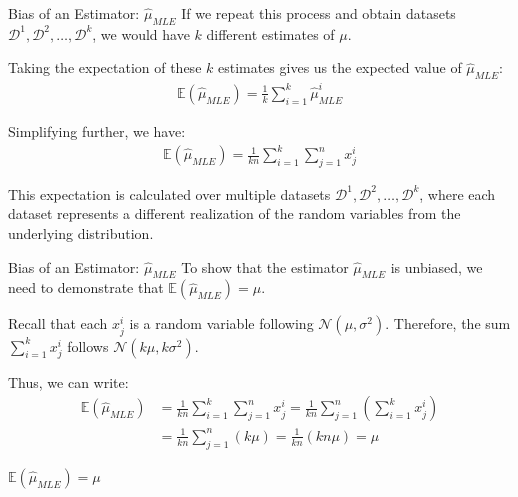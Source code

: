 \documentclass[handout]{beamer}
\begin{document}
    \begin{frame}{Bias of an Estimator: $\hat{\mu}_{MLE}$}
        If we repeat this process and obtain datasets $\mathcal{D}^1, \mathcal{D}^2, \ldots, \mathcal{D}^k$, we would have $k$ different estimates of $\mu$.
    
        Taking the expectation of these $k$ estimates gives us the expected value of $\hat{\mu}_{MLE}$:
        \begin{align*}
            \mathbb{E}(\hat{\mu}_{MLE}) = \frac{1}{k} \sum_{i=1}^k \hat{\mu}_{MLE}^i
        \end{align*}
    
        Simplifying further, we have:
        \begin{align*}
            \mathbb{E}(\hat{\mu}_{MLE}) = \frac{1}{kn} \sum_{i=1}^k \sum_{j=1}^n x^i_j
        \end{align*}
        
        This expectation is calculated over multiple datasets $\mathcal{D}^1, \mathcal{D}^2, \ldots, \mathcal{D}^k$, where each dataset represents a different realization of the random variables from the underlying distribution.
        
       
    \end{frame}
    
    \begin{frame}{Bias of an Estimator: $\hat{\mu}_{MLE}$}
        To show that the estimator $\hat{\mu}_{MLE}$ is unbiased, we need to demonstrate that $\mathbb{E}(\hat{\mu}_{MLE}) = \mu$.
        
        Recall that each $x^i_j$ is a random variable following $\mathcal{N}(\mu, \sigma^2)$. Therefore, the sum $\sum_{i=1}^k x^i_j$ follows $\mathcal{N}(k\mu, k\sigma^2)$.
        
        Thus, we can write:
        \begin{align*}
            \mathbb{E}(\hat{\mu}_{MLE}) &= \frac{1}{kn} \sum_{i=1}^k \sum_{j=1}^n x^i_j = \frac{1}{kn} \sum_{j=1}^n \left(\sum_{i=1}^k x^i_j\right) \\
            &= \frac{1}{kn} \sum_{j=1}^n (k\mu) = \frac{1}{kn} (kn\mu) =\mu
        \end{align*}
        
        \begin{tcolorbox}[colback=metropolisblue!5,colframe=metropolisblue,title= Estimator $\hat{\mu}_{MLE}$ is unbiased]
            $\mathbb{E}(\hat{\mu}_{MLE}) = \mu$
        \end{tcolorbox}

        
    \end{frame}
\end{document}
